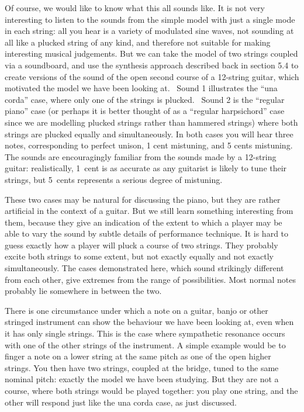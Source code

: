   Of course, we would like to know what this all sounds like. It is not very 
  interesting to listen to the sounds from the simple model with just a single 
  mode in each string: all you hear is a variety of modulated sine waves, not 
  sounding at all like a plucked string of any kind, and therefore not suitable 
  for making interesting musical judgements. But we can take the model of two 
  strings coupled via a soundboard, and use the synthesis approach described 
  back in section 5.4 to create versions of the sound of the open second course 
  of a 12-string guitar, which motivated the model we have been looking at.~ 
  Sound 1 illustrates the “una corda” case, where only one of the strings is 
  plucked.~ Sound 2 is the “regular piano” case (or perhaps it is better 
  thought of as a ``regular harpsichord'' case since we are modelling plucked 
  strings rather than hammered strings) where both strings are plucked equally 
  and simultaneously. In both cases you will hear three notes, corresponding to 
  perfect unison, 1 cent mistuning, and 5 cents mistuning. The sounds are 
  encouragingly familiar from the sounds made by a 12-string guitar: 
  realistically, 1~cent is as accurate as any guitarist is likely to tune their 
  strings, but 5~cents represents a serious degree of mistuning. 

\audio{}

\audio{}

  These two cases may be natural for discussing the piano, but they are rather 
  artificial in the context of a guitar. But we still learn something 
  interesting from them, because they give an indication of the extent to which 
  a player may be able to vary the sound by subtle details of performance 
  technique. It is hard to guess exactly how a player will pluck a course of 
  two strings. They probably excite both strings to some extent, but not 
  exactly equally and not exactly simultaneously. The cases demonstrated here, 
  which sound strikingly different from each other, give extremes from the 
  range of possibilities. Most normal notes probably lie somewhere in between 
  the two. 

  There is one circumstance under which a note on a guitar, banjo or other 
  stringed instrument can show the behaviour we have been looking at, even when 
  it has only single strings. This is the case where sympathetic resonance 
  occurs with one of the other strings of the instrument. A simple example 
  would be to finger a note on a lower string at the same pitch as one of the 
  open higher strings. You then have two strings, coupled at the bridge, tuned 
  to the same nominal pitch: exactly the model we have been studying. But they 
  are not a course, where both strings would be played together: you play one 
  string, and the other will respond just like the una corda case, as just 
  discussed. 

